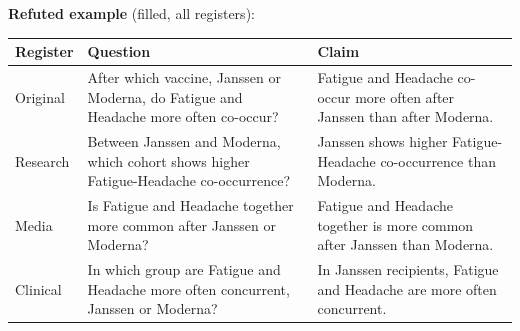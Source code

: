 \documentclass[11pt]{article}
\begin{document}
\vspace{3pt}
\textbf{Refuted example} (filled, all registers): \\
\begin{tabularx}{\linewidth}{@{}l L L@{}}
\toprule
\textbf{Register} & \textbf{Question} & \textbf{Claim} \\
\midrule
Original & After which vaccine, Janssen or Moderna, do Fatigue and Headache more often co-occur? & Fatigue and Headache co-occur more often after Janssen than after Moderna. \\
Research & Between Janssen and Moderna, which cohort shows higher Fatigue-Headache co-occurrence? & Janssen shows higher Fatigue-Headache co-occurrence than Moderna. \\
Media & Is Fatigue and Headache together more common after Janssen or Moderna? & Fatigue and Headache together is more common after Janssen than Moderna. \\
Clinical & In which group are Fatigue and Headache more often concurrent, Janssen or Moderna? & In Janssen recipients, Fatigue and Headache are more often concurrent. \\
\bottomrule
\end{tabularx}
\vspace{3pt}
\end{document}
